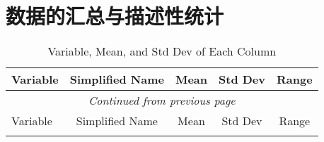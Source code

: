 \documentclass[AutoFakeBold]{LZUThesis-PgD&PhD}
\begin{document}
   \section{数据的汇总与描述性统计}

   \setlength{\LTleft}{-3.17cm}  %
   \begin{longtable}[H]{lcccc}
	   \caption{Variable, Mean, and Std Dev of Each Column} \label{tab:range} \\
   
	   \toprule
	   Variable & Simplified Name & Mean & Std Dev & Range \\ \midrule
	   \endfirsthead  %
	   \multicolumn{5}{c}{\textit{Continued from previous page}} \\ \midrule
	   Variable & Simplified Name & Mean & Std Dev & Range \\ \midrule
	   \endhead  %
   
	   \midrule
	   \endfoot  %
   
	   \bottomrule
	   \endlastfoot  %
   

\end{longtable}
\end{document}
